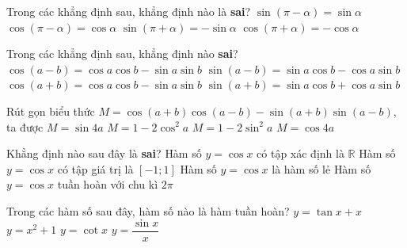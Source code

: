 \begin{bt}%
	Trong các khẳng định sau, khẳng định  nào là \textbf{sai}?
	\choice
	{$\sin(\pi-\alpha)=\sin\alpha$}
	{\True $\cos(\pi-\alpha)=\cos \alpha$}
	{$\sin(\pi+\alpha)=-\sin\alpha$}
	{$\cos(\pi+\alpha)=-\cos \alpha$}
\end{bt}

\begin{bt}%
	Trong các khẳng định sau, khẳng định nào \textbf{sai}?
	\choice
	{\True $\cos (a-b)=\cos a\cos b-\sin a\sin b$}
	{$\sin (a-b)=\sin a\cos b-\cos a\sin b$}
	{$\cos (a+b)=\cos a\cos b-\sin a\sin b$}
	{$\sin (a+b)=\sin a\cos b+\cos a\sin b$}
\end{bt}

\begin{bt}%
	Rút gọn biểu thức $M=\cos(a+b)\cos(a-b)-\sin (a+b)\sin(a-b)$, ta được
	\choice
	{$M=\sin 4a$}
	{$M=1-2\cos^2a$}
	{\True $M=1-2\sin^2a$}
	{$M=\cos 4a$}
\end{bt}

\begin{bt}%
	Khẳng định nào sau đây là \textbf{sai}?
	\choice
	{Hàm số $y=\cos x$ có tập xác định là $\mathbb{R}$}
	{Hàm số $y=\cos x$ có tập giá trị là $[-1;1]$}
	{\True Hàm số $y=\cos x$ là hàm số lẻ}
	{Hàm số $y=\cos x$ tuần hoàn với chu kì $2\pi$}
\end{bt}

\begin{bt}%
	Trong các hàm số sau đây, hàm số nào là hàm tuần hoàn?
	\choice
	{$y=\tan x+x$}
	{$y=x^2+1$}
	{\True $y=\cot x$}
	{$y=\dfrac{\sin x}{x}$}
\end{bt}


